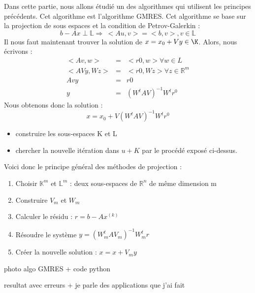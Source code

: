 \documentclass[12pt]{beamer}
\begin{document}
\begin{frame}
    Dans cette partie, nous allons étudié un des algorithmes qui utilisent les principes précédents. Cet algorithme est l'algorithme GMRES. 
    Cet algorithme se base sur la projection de sous espaces et la condition de Petrov-Galerkin :
    \begin{equation}
        b - Ax \perp \mathbb{L} \Rightarrow \ <Au, v> = <b, v>, v \in \mathbb{L}
        \label{Petrov-Galerkin}
    \end{equation}
    Il nous faut maintenant trouver la solution de $ x = x_0 + Vy \in \K$. Alors, nous écrivons : 
    \begin{eqnarray}
    <Av, w> &=& <r0, w> \forall w \in L\\
    <AVy, Wz> &=& <r0, Wz> \forall z \in \mathbb{R}^m \\
    Avy &=& r0 \\
    y &=& (W^t A V)^{-1} W^tr^0
    \end{eqnarray}
    Nous obtenons donc la solution : 
    \begin{equation}
    x = x_0 + V (W^t A V)^{-1} W^tr^0
    \end{equation}
\end{frame}
\begin{frame}
    \begin{itemize}
        \item construire les sous-espaces K et L
        \item chercher la nouvelle itération dans $u + K$ par le procédé exposé ci-dessus.
    \end{itemize}
    Voici donc le principe général des méthodes de projection : 
    \begin{enumerate}
        \item Choisir $\mathbb{K}^m$ et $\mathbb{L}^m$ : deux sous-espaces de $\mathbb{R}^n$ de même dimension m
        \item Construire $V_m$ et $W_m$
        \item Calculer le résidu : $r = b - Ax^{(k)}$
        \item Résoudre le système $y = (W^t_m A V_m)^{-1} W^t_mr$
        \item Créer la nouvelle solution : $x = x + V_m y$
    \end{enumerate}
\end{frame}
\begin{frame}
    photo algo GMRES + code python
\end{frame}
\begin{frame}
    resultat avec erreurs + je parle des applications que j'ai fait
\end{frame}
\end{document}
